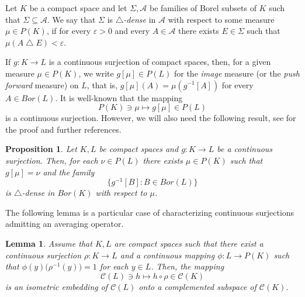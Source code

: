 \documentclass[12pt,fleqn]{amsart}
\numberwithin{equation}{section}
\newtheorem{lemma}[thm]{Lemma}
\newtheorem{prop}[thm]{Proposition}
\theoremstyle{definition}
\def\A{\mathcal A}
\def\C{\mathcal C}
\def\ep{\varepsilon}
\begin{document}
Let $K$ be a compact space and let $\Sigma,\mathcal{A}$ be 
families of Borel subsets of $K$ such that $\Sigma \subseteq \A$.
We say that $\Sigma$ is $\bigtriangleup$\emph{-dense} in $\mathcal{A}$ with respect to some measure $\mu \in P(K)$, if for every $\ep>0$ and every $A \in \mathcal{A}$ there exists $E \in \Sigma$ such that $\mu(A \bigtriangleup E)<\ep$. 

If $g \colon K \rightarrow L$ is  a continuous surjection of compact spaces, then,
for a given measure $\mu\in P(K)$, we write $g[\mu]\in P(L)$ for the \emph{image} measure (or the \emph{push forward} measure) on $L$, that is, $g[\mu](A)=\mu(g^{-1}[A])$ for every $A\in Bor(L)$.
It is well-known that the mapping
\[P(K)\ni \mu \mapsto g[\mu]\in P(L)\]
is a continuous surjection. However, we will also need
the following result, see \cite[Theorem 2.12 and Remark 2.14]{Pl23} for the proof and further references.  
 

\begin{prop} \label{surjection of measures}
Let $K, L$ be compact spaces and $g\colon K \rightarrow L$ be a continuous surjection. 
Then, for each $\nu \in P(L)$ there exists $\mu \in P(K)$ such that $g[\mu]=\nu$ and the family
\[\big\{g^{-1}[B] \colon B \in Bor(L)\big\}\]
 is $\bigtriangleup$-dense in $Bor(K)$ with respect to $\mu$.
\end{prop}
 
 The following lemma is a particular case of \cite[Proposition 4.1]{Pe68} characterizing continuous surjections
 admitting an averaging operator.
 
\begin{lemma} \label{projection}
Assume that $K, L$ are compact spaces such that there exist a continuous surjection $\rho \colon K \rightarrow L$ and a continuous mapping $\phi \colon L \rightarrow P(K)$ such that $\phi(y)\big(\rho^{-1}(y)\big)=1$ for each $y \in L$. Then, the mapping
\[ \C(L)\ni h\mapsto h\circ \rho\in \C(K)\]
is an isometric embedding of $\C(L)$ onto a complemented subspace of $\C(K)$.
\end{lemma}
\end{document}
